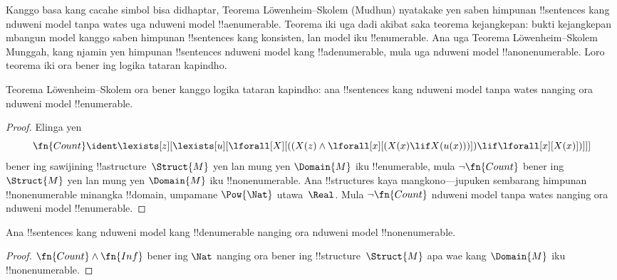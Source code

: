 \documentclass[../../../include/open-logic-section]{subfiles}
\begin{document}


\begin{explain}
Kanggo basa kang cacahe simbol bisa didhaptar, Teorema L\"owenheim--Skolem (Mudhun) nyatakake yen saben
himpunan !!{sentence}s kang nduweni model tanpa wates uga
nduweni model !!a{enumerable}. Teorema iki uga dadi akibat
saka teorema kejangkepan: bukti kejangkepan mbangun model
kanggo saben himpunan !!{sentence}s kang konsisten, lan
model iku !!{enumerable}. Ana uga Teorema
L\"owenheim--Skolem Munggah, kang njamin yen himpunan
!!{sentence}s nduweni model kang !!a{denumerable}, mula uga
nduweni model !!a{nonenumerable}. Loro teorema iki ora
bener ing logika tataran kapindho.
\end{explain}


\begin{thm}
 Teorema L\"owenheim--Skolem ora bener
kanggo logika tataran kapindho: ana !!{sentence}s kang nduweni
model tanpa wates nanging ora nduweni model !!{enumerable}.
\end{thm}

\begin{proof}
Elinga yen
\[
\fn{Count} \ident \lexists[z][\lexists[u][\lforall[X][((X(z) \land
      \lforall[x][(X(x) \lif X(u(x)))]) \lif \lforall[x][X(x)])]]]
\]
bener ing sawijining !!a{structure}~$\Struct{M}$ yen lan
mung yen $\Domain{M}$ iku !!{enumerable}, mula
$\lnot\fn{Count}$ bener ing~$\Struct{M}$
yen lan mung yen $\Domain{M}$ iku !!{nonenumerable}.
Ana !!{structure}s kaya mangkono---jupuken sembarang
himpunan !!{nonenumerable} minangka !!{domain},
umpamane $\Pow{\Nat}$ utawa~$\Real$. Mula
$\lnot \fn{Count}$ nduweni model tanpa wates nanging
ora nduweni model !!{enumerable}.
\end{proof}

\begin{thm}
Ana !!{sentence}s kang nduweni model kang !!{denumerable}
nanging ora nduweni model !!{nonenumerable}.
\end{thm}

\begin{proof}
$\fn{Count} \land \fn{Inf}$ bener ing $\Nat$ nanging
ora bener ing !!{structure}~$\Struct{M}$ apa wae
kang $\Domain{M}$ iku !!{nonenumerable}.
\end{proof}
\end{document}
